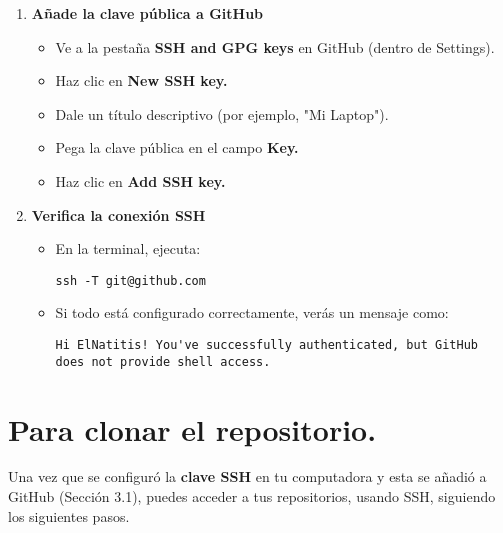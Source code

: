 \documentclass[10pt,a4paper]{book}
\begin{document}
\begin{enumerate}
	\item \textbf{Añade la clave pública a GitHub}
	\begin{itemize}
		\item Ve a la pestaña \textbf{SSH and GPG keys} en GitHub (dentro de Settings).

		\item Haz clic en \textbf{New SSH key.}

		\item Dale un título descriptivo (por ejemplo, "Mi Laptop").

		\item Pega la clave pública en el campo \textbf{Key.}

		\item Haz clic en \textbf{Add SSH key.}
	\end{itemize}
	\item \textbf{Verifica la conexión SSH}
	\begin{itemize}
		\item En la terminal, ejecuta:
		\begin{lstlisting}
ssh -T git@github.com
		\end{lstlisting}
		\item Si todo está configurado correctamente, verás un mensaje como:
		\begin{lstlisting}
Hi ElNatitis! You've successfully authenticated, but GitHub does not provide shell access.
		\end{lstlisting}
	\end{itemize}
\end{enumerate}
\newpage
\section{Para clonar el repositorio.}
Una vez que se configuró la \textbf{clave SSH} en tu computadora y esta se añadió a GitHub (Sección 3.1), puedes acceder a tus repositorios, usando SSH, siguiendo los siguientes pasos.
\end{document}
